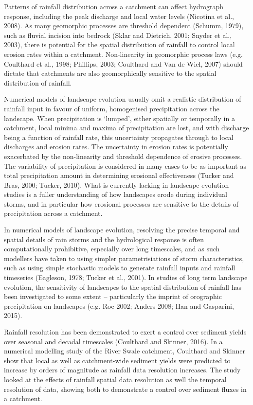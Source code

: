 \documentclass[12pt,oneside,PhD]{muthesis}
\begin{document}
Patterns of rainfall distribution across a catchment can affect hydrograph response, including the peak discharge and local water levels (Nicotina et al., 2008). As many geomorphic processes are threshold dependent (Schumm, 1979), such as fluvial incision into bedrock (Sklar and Dietrich, 2001; Snyder et al., 2003), there is potential for the spatial distribution of rainfall to control local erosion rates within a catchment. Non-linearity in geomorphic process laws (e.g. Coulthard et al., 1998; Phillips, 2003; Coulthard and Van de Wiel, 2007) should dictate that catchments are also geomorphically sensitive to the spatial distribution of rainfall. 

Numerical models of landscape evolution usually omit a realistic distribution of rainfall input in favour of uniform, homogenised precipitation across the landscape. When precipitation is `lumped', either spatially or temporally in a catchment, local minima and maxima of precipitation are lost, and with discharge being a function of rainfall rate, this uncertainty propagates through to local discharges and erosion rates. The uncertainty in erosion rates is potentially exacerbated by the non-linearity and threshold dependence of erosive processes. The variability of precipitation is considered in many cases to be as important as total precipitation amount in determining erosional effectiveness (Tucker and Bras, 2000; Tucker, 2010). What is currently lacking in landscape evolution studies is a fuller understanding of how landscapes erode during individual storms, and in particular how erosional processes are sensitive to the details of precipitation across a catchment. 

In numerical models of landscape evolution, resolving the precise temporal and spatial details of rain storms and the hydrological response is often computationally prohibitive, especially over long timescales, and as such modellers have taken to using simpler parametrisiations of storm characteristics, such as using simple stochastic models to generate rainfall inputs and rainfall timeseries (Eagleson, 1978; Tucker et al., 2001). In studies of long term landscape evolution, the sensitivity of landscapes to the spatial distribution of rainfall has been investigated to some extent -- particularly the imprint of orographic precipitation on landscapes (e.g. Roe 2002; Anders 2008; Han and Gasparini, 2015). 

Rainfall resolution has been demonstrated to exert a control over sediment yields over seasonal and decadal timescales (Coulthard and Skinner, 2016). In a numerical modelling study of the River Swale catchment, Coulthard and Skinner show that local as well as catchment-wide sediment yields were predicted to increase by orders of magnitude as rainfall data resolution increases. The study looked at the effects of rainfall spatial data resolution as well the temporal resolution of data, showing both to demonstrate a control over sediment fluxes in a catchment. 
\end{document}
